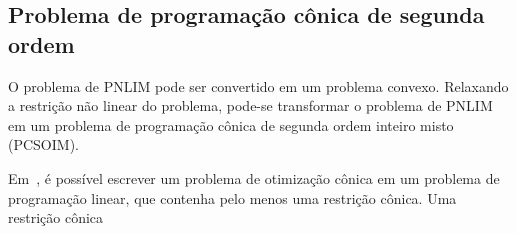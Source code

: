 \subsection{Problema de programação cônica de segunda ordem}

O problema de PNLIM pode ser convertido em um problema convexo. Relaxando a restrição não linear do problema, pode-se transformar o problema de PNLIM em um problema de programação cônica de segunda ordem inteiro misto (PCSOIM).

Em~\cite{Romais2014ReconfiguracaoMista}, é possível escrever um problema de otimização cônica em um problema de programação linear, que contenha pelo menos uma restrição cônica. 
Uma restrição cônica 